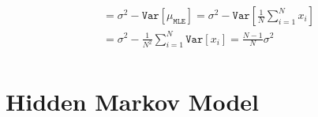 \begin{align}
	                                                   & = \sigma^2 -  \mathtt{Var}\left[\mu_{\mathtt{MLE}}\right]  =  \sigma^2 - \mathtt{Var}\left[\frac{1}{N} \sum_{i=1}^N x_i \right]                                                                                                                             \\
	                                                   & = \sigma^2 - \frac{1}{N^2} \sum_{i=1}^N \mathtt{Var}\left[x_i\right] = \frac{N-1}{N} \sigma^2                                                                                                                                                               \\
\end{align}

\section{Hidden Markov Model}



